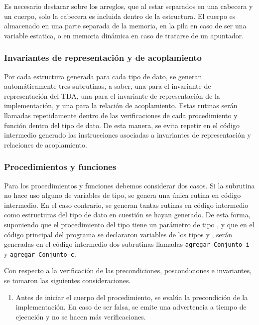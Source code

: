 {{Es necesario destacar sobre los arreglos, que al estar separados en una cabecera
y un cuerpo, solo la cabecera es incluida dentro de la estructura. El cuerpo es
almacenado en una parte separada de la memoria, en la pila en caso de ser una
variable estatica, o en memoria dinámica en caso de tratarse de un apuntador.

\subsubsection{Invariantes de representación y de acoplamiento}

Por cada estructura generada para cada tipo de dato, se generan automáticamente
tres subrutinas, a saber, una para el invariante de representación del TDA,  una
para el invariante de representación de la implementación, y una para la
relación de acoplamiento. Estas rutinas serán llamadas repetidamente dentro de
las verificaciones de cada procedimiento y función dentro del tipo de dato. De
esta manera, se evita repetir en el código intermedio generado las instrucciones
asociadas a invariantes de representación y relaciones de acoplamiento.

\subsubsection{Procedimientos y funciones}

Para los procedimientos y funciones debemos considerar dos casos. Si la
subrutina no hace uso alguno de variables de tipo, se genera una única rutina en
código intermedio. En el caso contrario, se generan tantas rutinas en código
intermedio como estructuras del tipo de dato en cuestión se hayan generado. De
esta forma, suponiendo que el procedimiento  del tipo
 tiene un parámetro de tipo , y que en
el código principal del programa se declararon variables de los tipos
 y , serán generadas en el código
intermedio dos subrutinas llamadas \texttt{agregar-Conjunto-i} y
\texttt{agregar-Conjunto-c}.

Con respecto a la verificación de las precondiciones, poscondiciones e
invariantes, se tomaron las siguientes consideraciones.

\begin{enumerate}

  \item Antes de iniciar el cuerpo del procedimiento, se evalúa la precondición
  de la implementación. En caso de ser falsa, se emite una advertencia a tiempo
  de ejecución y no se hacen más verificaciones.


\end{enumerate}}}
